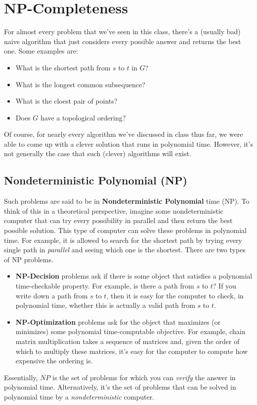 \documentclass[letterpaper]{article}
\begin{document}
\section{NP-Completeness}
For almost every problem that we've seen in this class, there's a (usually bad) naive algorithm that just considers every possible answer and returns the best one. Some examples are: 
\begin{itemize}
    \item What is the shortest path from $s$ to $t$ in $G$? 
    \item What is the longest common subsequence? 
    \item What is the cloest pair of points? 
    \item Does $G$ have a topological ordering?
\end{itemize}
Of course, for nearly every algorithm we've discussed in class thus far, we were able to come up with a clever solution that runs in polynomial time. However, it's not generally the case that such (clever) algorithms will exist. 

\subsection{Nondeterministic Polynomial (NP)}
Such problems are said to be in \textbf{Nondeterministic Polynomial} time (NP). To think of this in a theoretical perspective, imagine some nondeterministic computer that can try every possibility in parallel and then return the best possible solution. This type of computer can solve these problems in polynomial time. For example, it is allowed to search for the shortest path by trying every single path in \emph{parallel} and seeing which one is the shortest. There are two types of NP problems.
\begin{itemize}
    \item \textbf{NP-Decision} problems ask if there is some object that satisfies a polynomial time-checkable property. For example, is there a path from $s$ to $t$? If you write down a path from $s$ to $t$, then it is easy for the computer to check, in polynomial time, whether this is actually a valid path from $s$ to $t$.
    \item \textbf{NP-Optimization} problems ask for the object that maximizes (or minimizes) some polynomial time-computable objective. For example, chain matrix multiplication takes a sequence of matrices and, given the order of which to multiply these matrices, it's easy for the computer to compute how expensive the ordering is. 
\end{itemize}
Essentially, $NP$ is the set of problems for which you can \emph{verify} the answer in polynomial time. Alternatively, it's the set of problems that can be solved in polynomial time by a \emph{nondeterministic} computer. 
\end{document}
